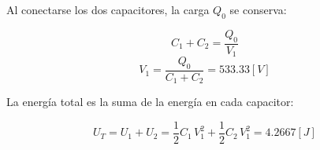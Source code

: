 \documentclass[letter,11pt]{article}
\begin{document}
\begin{enumerate}
Al conectarse los dos capacitores, la carga $Q_0$ se conserva:

\begin{equation*}
    C_1+C_2 = \frac{Q_0}{V_1}
\end{equation*}
\begin{equation*}
    V_1 = \frac{Q_0}{C_1+C_2} = 533.33 [V]
\end{equation*}

La energía total es la suma de la energía en cada capacitor:

\begin{equation*}
    U_T = U_1+U_2 = \frac{1}{2}C_1\,V^2_1+\frac{1}{2}C_2\,V^2_1 = 4.2667 [J]
\end{equation*}

\end{enumerate}
\end{document}
